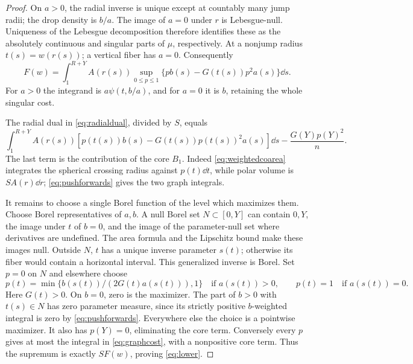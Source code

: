 \begin{proof}
On \(a>0\), the radial inverse is unique except at countably many jump
radii; the drop density is \(b/a\). The image of \(a=0\) under \(r\)
is Lebesgue-null. Uniqueness of the Lebesgue decomposition therefore
identifies these as the absolutely continuous and singular parts of
\(\mu\), respectively. At a nonjump radius \(t(s)=w(r(s))\); a vertical
fiber has \(a=0\). Consequently
\begin{equation}\label{eq:graphcost}
 F(w)=\int_1^{R+Y}A(r(s))
       \sup_{0\le p\le1}\{p b(s)-G(t(s))p^2a(s)\}\dd s.
\end{equation}
For \(a>0\) the integrand is \(a\psi(t,b/a)\), and for \(a=0\) it
is \(b\), retaining the whole singular cost.

The radial dual in \eqref{eq:radialdual}, divided by \(S\), equals
\begin{equation}\label{eq:graphdual}
 \int_1^{R+Y}A(r(s))
       [p(t(s))b(s)-G(t(s))p(t(s))^2a(s)]\dd s
                                  -\frac{G(Y)p(Y)^2}{n}.
\end{equation}
The last term is the contribution of the core \(B_1\).
Indeed \eqref{eq:weightedcoarea} integrates the spherical crossing
radius against \(p(t)\dd t\), while polar volume is
\(S A(r)\dd r\); \eqref{eq:pushforwards} gives the two graph integrals.

It remains to choose a single Borel function of the level which
maximizes them. Choose Borel representatives of \(a,b\). A null
Borel set \(N\subset[0,Y]\) can contain \(0,Y\), the image under \(t\)
of \(b=0\), and the image of the parameter-null set where derivatives
are undefined. The area formula and the Lipschitz bound make these
images null. Outside \(N\), \(t\) has a unique inverse parameter
\(s(t)\); otherwise its fiber would contain a horizontal interval.
This generalized inverse is Borel. Set \(p=0\) on \(N\) and elsewhere
choose
\[
 p(t)=\min\{b(s(t))/(2G(t)a(s(t))),1\}\quad\text{if }a(s(t))>0,
 \qquad p(t)=1\quad\text{if }a(s(t))=0.
\]
Here \(G(t)>0\). On \(b=0\), zero is the maximizer. The part of
\(b>0\) with \(t(s)\in N\) has zero parameter measure, since its
strictly positive \(b\)-weighted integral is zero by
\eqref{eq:pushforwards}. Everywhere else the choice is a pointwise
maximizer. It also has \(p(Y)=0\), eliminating the core term.
Conversely every \(p\) gives at most the integral in
\eqref{eq:graphcost}, with a nonpositive core term.
Thus the supremum is exactly \(S F(w)\), proving \eqref{eq:lower}.
\end{proof}
